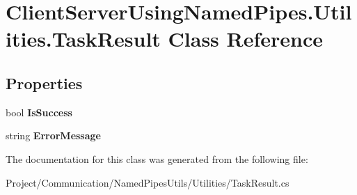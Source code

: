 \hypertarget{class_client_server_using_named_pipes_1_1_utilities_1_1_task_result}{}\section{Client\+Server\+Using\+Named\+Pipes.\+Utilities.\+Task\+Result Class Reference}
\label{class_client_server_using_named_pipes_1_1_utilities_1_1_task_result}
\subsection*{Properties}
\begin{DoxyCompactItemize}
\item 
\mbox{\label{class_client_server_using_named_pipes_1_1_utilities_1_1_task_result_a3c996932ff1f7e1754af3f0b34f6669e}} 
bool {\bfseries Is\+Success}
\item 
\mbox{\label{class_client_server_using_named_pipes_1_1_utilities_1_1_task_result_a9fe5fdb20d17f6064ac18f8e68c268a3}} 
string {\bfseries Error\+Message}
\end{DoxyCompactItemize}


The documentation for this class was generated from the following file\+:\begin{DoxyCompactItemize}
\item 
Project/\+Communication/\+Named\+Pipes\+Utils/\+Utilities/Task\+Result.\+cs\end{DoxyCompactItemize}
